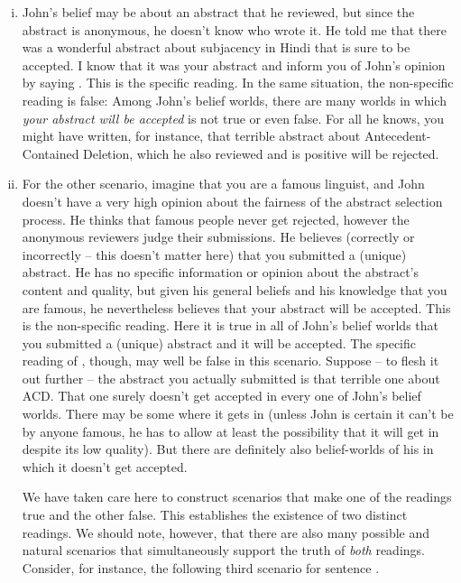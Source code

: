 \begin{enumerate}[(i)]
	
	\item John's belief may be about an abstract that he reviewed, but since the abstract is anonymous, he doesn't know who wrote it. He told me that there was a wonderful abstract about subjacency in Hindi that is sure to be accepted. I know that it was your abstract and inform you of John's opinion by saying \Last. This is the specific reading. In the same situation, the non-specific reading is false: Among John's belief worlds, there are many worlds in which \emph{your abstract will be accepted} is not true or even false. For all he knows, you might have written, for instance, that terrible abstract about Antecedent-Contained Deletion, which he also reviewed and is positive will be rejected.
	
	\item For the other scenario, imagine that you are a famous linguist, and John doesn't have a very high opinion about the fairness of the abstract selection process. He thinks that famous people never get rejected, however the anonymous reviewers judge their submissions. He believes (correctly or incorrectly -- this doesn't matter here) that you submitted a (unique) abstract. He has no specific information or opinion about the abstract's content and quality, but given his general beliefs and his knowledge that you are famous, he nevertheless believes that your abstract will be accepted. This is the non-specific reading. Here it is true in all of John's belief worlds that you submitted a (unique) abstract and it will be accepted. The specific reading of \Last, though, may well be false in this scenario. Suppose -- to flesh it out further -- the abstract you actually submitted is that terrible one about ACD. That one surely doesn't get accepted in every one of John's belief worlds. There may be some where it gets in (unless John is certain it can't be by anyone famous, he has to allow at least the possibility that it will get in despite its low quality). But there are definitely also belief-worlds of his in which it doesn't get accepted.
	
	We have taken care here to construct scenarios that make one of the readings true and the other false. This establishes the existence of two distinct readings. We should note, however, that there are also many possible and natural scenarios that simultaneously support the truth of \emph{both} readings. Consider, for instance, the following third scenario for sentence \Last.
	

\end{enumerate}

